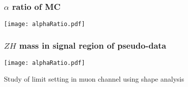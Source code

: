 \documentclass[aspectratio=169]{beamer}
\begin{document}
\begin{frame}
  \frametitle{$\alpha$ ratio of MC}
  \begin{center}
    \texttt{[image: alphaRatio.pdf]}
  \end{center}
\end{frame}
\begin{frame}
  \frametitle{$ZH$ mass in signal region of pseudo-data}
  \begin{center}
    \texttt{[image: alphaRatio.pdf]}
  \end{center}
\end{frame}
\begin{frame}
  \LARGE{\centerline{Study of limit setting in muon channel using shape analysis}}
\end{frame}
\renewcommand{\arraystretch}{1.2}
\end{document}
